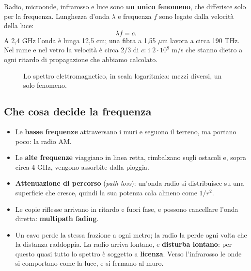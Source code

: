 Radio, microonde, infrarosso e luce sono \textbf{un unico fenomeno}, che differisce solo per la frequenza. Lunghezza d'onda $\lambda$ e
frequenza $f$ sono legate dalla velocità della luce:
$$\lambda f = c.$$
A 2,4 GHz l'onda è lunga 12,5 cm; una fibra a 1,55 $\mu$m lavora a circa 190 THz. Nel rame e nel vetro la velocità è circa $2/3$ di
$c$: i $2 \cdot 10^8$ m/s che stanno dietro a ogni ritardo di propagazione che abbiamo calcolato.

\begin{figure}[H]
\centering
{}
\caption{Lo spettro elettromagnetico, in scala logaritmica: mezzi diversi, un solo fenomeno.}
\end{figure}

\subsection{Che cosa decide la frequenza}

\begin{itemize}
    \item Le \textbf{basse frequenze} attraversano i muri e seguono il terreno, ma portano poco: la radio AM.
    \item Le \textbf{alte frequenze} viaggiano in linea retta, rimbalzano sugli ostacoli e, sopra circa 4 GHz, vengono assorbite dalla
          pioggia.
    \item \textbf{Attenuazione di percorso} (\emph{path loss}): un'onda radio si distribuisce su una superficie che cresce, quindi la sua
          potenza cala almeno come $1/r^2$.
    \item Le copie riflesse arrivano in ritardo e fuori fase, e possono cancellare l'onda diretta: \textbf{multipath fading}.
    \item Un cavo perde la stessa frazione a ogni metro; la radio la perde ogni volta che la distanza raddoppia. La radio arriva
          lontano, e \textbf{disturba lontano}: per questo quasi tutto lo spettro è soggetto a \textbf{licenza}. Verso l'infrarosso le onde
          si comportano come la luce, e si fermano al muro.
\end{itemize}

